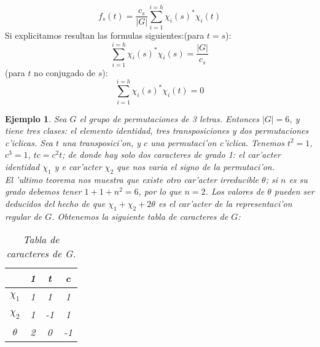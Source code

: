 \documentclass[a4paper,openright,12pt]{report}
\numberwithin{equation}{section} %
\newtheorem{ejemplo}{Ejemplo}[section] %
\begin{document}
\[
f_{s}(t)=\frac{c_{s}}{|G|}\sum_{i=1}^{i=h}\chi_{i}(s)^{*}\chi_{i}(t)
\]
Si explicitamos resultan las formulas siguientes:(para $t=s$):
\[
\sum_{i=1}^{i=h}\chi_{i}(s)^{*}\chi_{i}(s)=\frac{|G|}{c_{s}}
\]
(para $t$ no conjugado de $s$):
\[
\sum_{i=1}^{i=h}\chi_{i}(s)^{*}\chi_{i}(t)=0
\]
\begin{ejemplo}
Sea $G$ el grupo de permutaciones de 3 letras. Entonces $|G|=6$, y tiene tres clases: el elemento identidad, tres transposiciones y dos permutaciones c'iclicas. Sea $t$ una transposici'on, y $c$ una permutaci'on c'iclica. Tenemos $t^{2}=1$, $c^{3}=1$, $tc=c^{2}t$; de donde hay solo dos caracteres de grado 1: el car'acter identidad $\chi_{1}$ y e car'acter $\chi_{2}$ que nos varia el signo de la permutaci'on.\\
El 'ultimo teorema nos muestra que existe otro car'acter irreducible $\theta$; si $n$ es su grado debemos tener $1+1+n^{2}=6$, por lo que $n=2$. Los valores de $\theta$ pueden ser deducidos del hecho de que $\chi_{1}+\chi_{2}+2\theta$ es el car'acter de la representaci'on regular de $G$. Obtenemos la siguiente tabla de caracteres de $G$:
\begin{table}[H]
\begin{center}
\begin{tabular}{|c|c|c|c|}
\hline
& 1 & t & c \\
\hline \hline
$\chi_{1}$ & 1 & 1 & 1 \\ 
$\chi_{2}$ & 1 & -1 & 1 \\ 
$\theta$ & 2 & 0 & -1 \\ 
\hline
\end{tabular}
\caption{Tabla de caracteres de G.}
\label{tabla:caracteresG}
\end{center}
\end{table}
\end{ejemplo}
\end{document}
